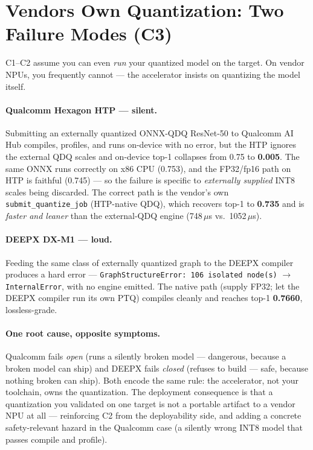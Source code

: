 \documentclass[11pt]{article}
\begin{document}
\section{Vendors Own Quantization: Two Failure Modes (C3)}

C1--C2 assume you can even \emph{run} your quantized model on the target. On vendor NPUs, you frequently cannot --- the accelerator insists on quantizing the model itself.

\paragraph{Qualcomm Hexagon HTP --- silent.}
Submitting an externally quantized ONNX-QDQ ResNet-50 to Qualcomm AI Hub compiles, profiles, and runs on-device with no error, but the HTP ignores the external QDQ scales and on-device top-1 collapses from 0.75 to \textbf{0.005}. The same ONNX runs correctly on x86 CPU (0.753), and the FP32/fp16 path on HTP is faithful (0.745) --- so the failure is specific to \emph{externally supplied} INT8 scales being discarded. The correct path is the vendor's own \texttt{submit\_quantize\_job} (HTP-native QDQ), which recovers top-1 to \textbf{0.735} and is \emph{faster and leaner} than the external-QDQ engine (748\,$\mu$s vs.\ 1052\,$\mu$s).

\paragraph{DEEPX DX-M1 --- loud.}
Feeding the same class of externally quantized graph to the DEEPX compiler produces a hard error --- \texttt{GraphStructureError: 106 isolated node(s)} $\rightarrow$ \texttt{InternalError}, with no engine emitted. The native path (supply FP32; let the DEEPX compiler run its own PTQ) compiles cleanly and reaches top-1 \textbf{0.7660}, lossless-grade.

\paragraph{One root cause, opposite symptoms.}
Qualcomm fails \emph{open} (runs a silently broken model --- dangerous, because a broken model can ship) and DEEPX fails \emph{closed} (refuses to build --- safe, because nothing broken can ship). Both encode the same rule: the accelerator, not your toolchain, owns the quantization. The deployment consequence is that a quantization you validated on one target is not a portable artifact to a vendor NPU at all --- reinforcing C2 from the deployability side, and adding a concrete safety-relevant hazard in the Qualcomm case (a silently wrong INT8 model that passes compile and profile).
\end{document}
